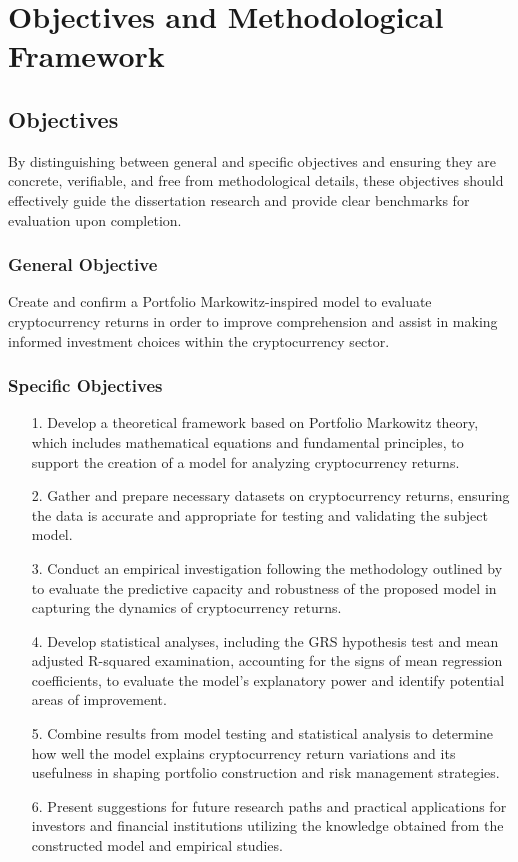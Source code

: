 \chapter{Objectives and Methodological Framework}
\label{c3}
\section{Objectives}
\label{c31}

By distinguishing between general and specific objectives and ensuring they are concrete, verifiable, and free from methodological details, these objectives should effectively guide the dissertation research and provide clear benchmarks for evaluation upon completion.
\subsection{General Objective}
Create and confirm a Portfolio Markowitz-inspired model to evaluate cryptocurrency returns in order to improve comprehension and assist in making informed investment choices within the cryptocurrency sector.
\subsection{Specific Objectives}
\begin{enumerate}
	\item[1.] Develop a theoretical framework based on Portfolio Markowitz theory, which includes mathematical equations and fundamental principles, to support the creation of a model for analyzing cryptocurrency returns.
	\item[2.] Gather and prepare necessary datasets on cryptocurrency returns, ensuring the data is accurate and appropriate for testing and validating the subject model.
	\item[3.] Conduct an empirical investigation following the methodology outlined by \cite{fama1993} to evaluate the predictive capacity and robustness of the proposed model in capturing the dynamics of cryptocurrency returns.
	\item[4.] Develop statistical analyses, including the GRS hypothesis test and mean adjusted R-squared examination, accounting for the signs of mean regression coefficients, to evaluate the model's explanatory power and identify potential areas of improvement.
	\item[5.] Combine results from model testing and statistical analysis to determine how well the model explains cryptocurrency return variations and its usefulness in shaping portfolio construction and risk management strategies.
	\item[6.] Present suggestions for future research paths and practical applications for investors and financial institutions utilizing the knowledge obtained from the constructed model and empirical studies.
\end{enumerate}
